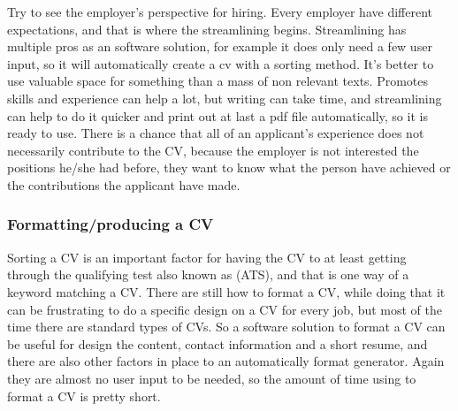 Try to see the employer's perspective for hiring. Every employer have different expectations, 
and that is where the streamlining begins. Streamlining has multiple pros as an software solution,
for example it does only need a few user input, so it will automatically create a cv with a sorting method. 
It's better to use valuable space for something than a mass of non relevant texts.
Promotes skills and experience can help a lot, but writing can take time, and streamlining can help to do it quicker 
and print out at last a pdf file automatically, so it is ready to use.
There is a chance that all of an applicant's experience does not necessarily contribute to the CV, 
because the employer is not interested the positions he/she had before, they want to know what the person have achieved
or the contributions the applicant have made. 


\subsubsection{Formatting/producing a CV} {
Sorting a CV is an important factor for having the CV to at least getting through the qualifying test also known as (ATS),
and that is one way of a keyword matching a CV. There are still how to format a CV, 
while doing that it can be frustrating to do a specific design on a CV for every job, 
but most of the time there are standard types of CVs.
So a software solution to format a CV can be useful for design the content, contact information and a short resume,
and there are also other factors in place to an automatically format generator. Again they are almost no user input to be needed, 
so the amount of time using to format a CV is pretty short. 

}
